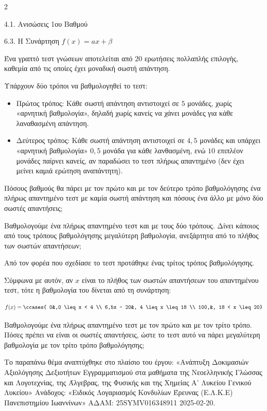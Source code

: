 \begin{ylh}{2}
    \item 4.1. Ανισώσεις 1ου Βαθμού
    \item 6.3. Η Συνάρτηση $f(x)=ax+\beta$
\end{ylh}
Ένα γραπτό τεστ γνώσεων αποτελείται από $20$ ερωτήσεις πολλαπλής επιλογής, καθεμία από τις οποίες έχει μοναδική σωστή απάντηση.

Υπάρχουν δύο τρόποι να βαθμολογηθεί το τεστ:

\begin{itemize}
\item
  Πρώτος τρόπος: Κάθε σωστή απάντηση αντιστοιχεί σε $5$ μονάδες, χωρίς «αρνητική βαθμολογία», δηλαδή χωρίς κανείς να χάνει μονάδες για κάθε λαναθασμένη απάντηση.
\item
  Δεύτερος τρόπος: Κάθε σωστή απάντηση αντιστοιχεί σε $4,5$ μονάδες και υπάρχει «αρνητική βαθμολογία» $0,5$ μονάδα για κάθε λανθασμένη, ενώ $10$ επιπλέον μονάδες παίρνει κανείς, αν παραδώσει το τεστ πλήρως απαντημένο (δεν έχει μείνει καμιά ερώτηση αναπάντητη).
\end{itemize}

\begin{alist}
\item Πόσους βαθμούς θα πάρει με τον πρώτο και με τον δεύτερο τρόπο βαθμολόγησης ένα πλήρως απαντημένο τεστ με καμία σωστή απάντηση και πόσους ένα άλλο με μόνο δύο σωστές απαντήσεις;
\item Βαθμολογούμε ένα πλήρως απαντημένο τεστ και με τους δύο τρόπους. Δίνει κάποιος από τους τρόπους βαθμολόγησης μεγαλύτερη βαθμολογία, ανεξάρτητα από το πλήθος των σωστών απαντήσεων;
\item Από τον φορέα που σχεδίασε το τεστ προτάθηκε ένας τρίτος τρόπος βαθμολόγησης.

Σύμφωνα με αυτόν, αν $x$ είναι το πλήθος των σωστών απαντήσεων του απαντημένου τεστ, τότε η βαθμολογία του δίνεται από τη συνάρτηση:

\begin{equation*}f(x) = \ccases{
0&,0 \leq x < 4 \\
6,5x - 20&, 4 \leq x \leq 18 \\
100,&, 18 < x \leq 20}
\end{equation*}

Βαθμολογούμε ένα πλήρως απαντημένο τεστ με τον πρώτο και με τον τρίτο τρόπο. Πόσες πρέπει να είναι οι σωστές απαντήσεις, ώστε το τεστ αυτό να πάρει μεγαλύτερη βαθμολογία με τον τρίτο τρόπο βαθμολόγησης;


{\footnotesize Το παραπάνω θέμα αναπτύχθηκε στο πλαίσιο του έργου: «Ανάπτυξη Δοκιμασιών Αξιολόγησης Δεξιοτήτων Εγγραμματισμού στα μαθήματα της Νεοελληνικής Γλώσσας και Λογοτεχνίας, της Άλγεβρας, της Φυσικής και της Χημείας Α' Λυκείου Γενικού Λυκείου» Ανάδοχος: «Ειδικός Λογαριασμός Κονδυλίων Έρευνας (Ε.Λ.Κ.Ε) Πανεπιστημίου Ιωαννίνων» ΑΔΑΜ: 25SYMV016348911 2025-02-20.}
\end{alist}

